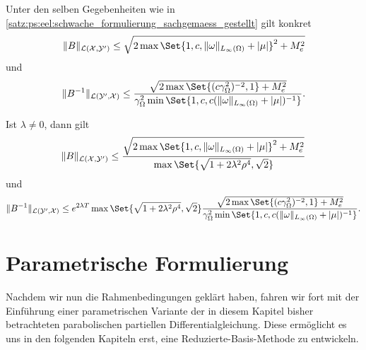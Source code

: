 \begin{Korollar}
\label{kor:ps:eel:schwache_formulierung_operator_schranken}
    Unter den selben Gegebenheiten wie in \cref{satz:ps:eel:schwache_formulierung_sachgemaess_gestellt} gilt konkret
    \begin{equation}
        \norm{B}_{\mathcal L(\mathcal X, \mathcal Y')} \leq \sqrt{2 \max\Set{1, c, \norm{\omega}_{L_{\infty}(\Omega)} + \abs{\mu}}^{2} + M_{e}^{2}}
    \end{equation}
    und
    \begin{equation}
        \norm{B^{-1}}_{\mathcal L(\mathcal Y', \mathcal X)} \leq \frac{\sqrt{2 \max \Set{(c \gamma_{\Omega}^{2})^{-2}, 1} + M_{e}^{2}}}{\gamma_{\Omega}^{2} \min\Set{1, c , c  (\norm{\omega}_{L_{\infty}(\Omega)} + \abs{\mu})^{-1}}}.
    \end{equation}

    Ist $\lambda \neq 0$, dann gilt
    \begin{equation}
        \norm{B}_{\mathcal L(\mathcal X, \mathcal Y')} \leq \frac{\sqrt{2 \max\Set{1, c, \norm{\omega}_{L_{\infty}(\Omega)} + \abs{\mu}}^{2} + M_{e}^{2}}}{\max\Set{\sqrt{1 + 2 \lambda^{2} \rho^{4}}, \sqrt{2}}}
    \end{equation}
    und
    \begin{equation}
        \norm{B^{-1}}_{\mathcal L(\mathcal Y', \mathcal X)} \leq e^{2 \lambda T} \max\Set{\sqrt{1 + 2 \lambda^{2} \rho^{4}}, \sqrt{2}} \frac{\sqrt{2 \max \Set{(c \gamma_{\Omega}^{2})^{-2}, 1} + M_{e}^{2}}}{\gamma_{\Omega}^{2} \min\Set{1, c , c  (\norm{\omega}_{L_{\infty}(\Omega)} + \abs{\mu})^{-1}}}.
    \end{equation}
\end{Korollar}





\section{Parametrische Formulierung} %
\label{sec:ps:pf:parametrische_formulierung}

Nachdem wir nun die Rahmenbedingungen geklärt haben, fahren wir fort mit der Einführung einer parametrischen Variante der in diesem Kapitel bisher betrachteten parabolischen partiellen Differentialgleichung.
Diese ermöglicht es uns in den folgenden Kapiteln erst, eine Reduzierte-Basis-Methode zu entwickeln.

